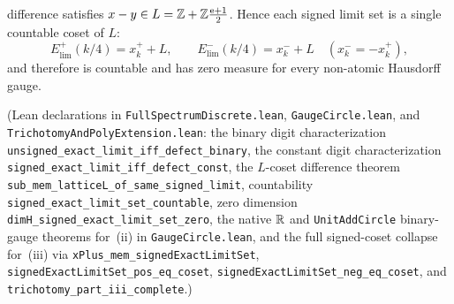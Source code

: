 \begin{theorem}
\begin{enumerate}[label=(\roman*),leftmargin=2em]
difference satisfies $x-y\in L=\mathbb{Z}+\mathbb{Z}\frac{\mathrm{e}+1}{2}$. Hence each signed limit
set is a single countable coset of $L$:
\[
E_{\mathrm{lim}}^+(k/4)=x_k^+ + L,\qquad
E_{\mathrm{lim}}^-(k/4)=x_k^- + L\quad(x_k^-=-x_k^+),
\]
and therefore is countable and has zero measure for every non-atomic Hausdorff
gauge.
\end{enumerate}
(Lean declarations in \texttt{Full\allowbreak Spectrum\allowbreak Discrete.lean},
\texttt{Gauge\allowbreak Circle.lean}, and
\texttt{Trichotomy\allowbreak And\allowbreak Poly\allowbreak Extension.lean}:
the binary digit characterization \texttt{unsigned\_\allowbreak exact\_\allowbreak limit\_\allowbreak iff\_\allowbreak defect\_\allowbreak binary},
the constant digit characterization \texttt{signed\_\allowbreak exact\_\allowbreak limit\_\allowbreak iff\_\allowbreak defect\_\allowbreak const},
the $L$-coset difference theorem \texttt{sub\_\allowbreak mem\_\allowbreak latticeL\_\allowbreak of\_\allowbreak same\_\allowbreak signed\_\allowbreak limit},
countability \texttt{signed\_\allowbreak exact\_\allowbreak limit\_\allowbreak set\_\allowbreak countable},
zero dimension \texttt{dimH\_\allowbreak signed\_\allowbreak exact\_\allowbreak limit\_\allowbreak set\_\allowbreak zero},
the native $\mathbb{R}$ and \texttt{UnitAddCircle} binary-gauge theorems for~(ii) in \texttt{GaugeCircle.lean},
and the full signed-coset collapse for~(iii) via
\texttt{xPlus\_\allowbreak mem\_\allowbreak signed\allowbreak Exact\allowbreak LimitSet},
\texttt{signed\allowbreak Exact\allowbreak LimitSet\_\allowbreak pos\_\allowbreak eq\_\allowbreak coset},
\texttt{signed\allowbreak Exact\allowbreak LimitSet\_\allowbreak neg\_\allowbreak eq\_\allowbreak coset}, and
\texttt{trichotomy\_\allowbreak part\_\allowbreak iii\_\allowbreak complete}.)
\end{theorem}

